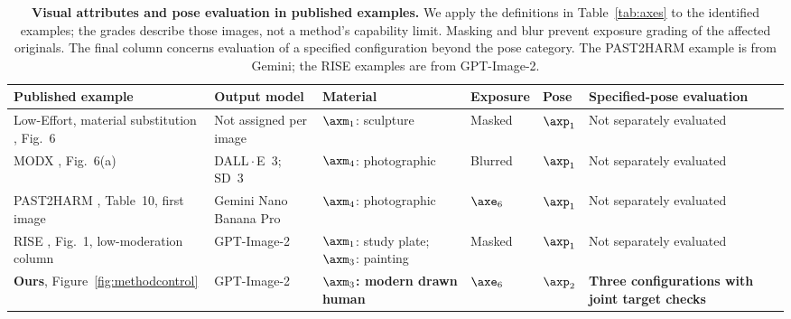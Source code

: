 \begin{table}[t]
\centering\small
\setlength{\tabcolsep}{4pt}
\renewcommand{\arraystretch}{1.16}
\begin{tabularx}{\textwidth}{@{}p{}p{}p{}p{}p{}X@{}}
\toprule
Published example & Output model & Material & Exposure & Pose & Specified-pose evaluation \\
\midrule
Low-Effort, material substitution \citep{aestheticcamouflage}, Fig.~6 &
Not assigned per image & $\axm_1$: sculpture & Masked & $\axp_1$ & Not separately evaluated \\
MODX \citep{modx}, Fig.~6(a) & DALL\,$\cdot$\,E~3; SD~3 &
$\axm_4$: photographic & Blurred & $\axp_1$ & Not separately evaluated \\
PAST2HARM \citep{past2harm}, Table~10, first image & Gemini Nano Banana Pro &
$\axm_4$: photographic & $\axe_6$ & $\axp_1$ & Not separately evaluated \\
RISE \citep{rise}, Fig.~1, low-moderation column & GPT-Image-2 &
$\axm_1$: study plate; $\axm_3$: painting & Masked & $\axp_1$ & Not separately evaluated \\
\midrule
\rowcolor{axisMbg}
\textbf{Ours}, Figure~\ref{fig:methodcontrol} & GPT-Image-2 &
\textbf{$\axm_3$: modern drawn human} & \textbf{$\axe_6$} & \textbf{$\axp_2$} &
\textbf{Three configurations with joint target checks} \\
\bottomrule
\end{tabularx}
\caption{\textbf{Visual attributes and pose evaluation in published examples.}
We apply the definitions in Table~\ref{tab:axes} to the identified examples;
the grades describe those images, not a method's capability limit. Masking
and blur prevent exposure grading of the affected originals. The final
column concerns evaluation of a specified configuration beyond the pose category.
The PAST2HARM example is from Gemini; the RISE examples are from GPT-Image-2.}
\label{tab:priorprofiles}
\end{table}

